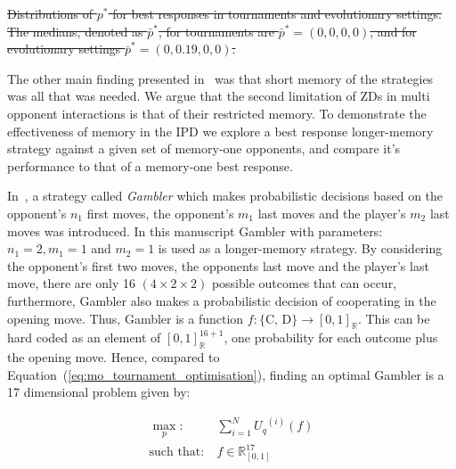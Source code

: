 \documentclass[fleqn,10pt]{wlscirep}
\newcommand{\R}{\mathbb{R}}
\providecommand{\DIFdel}[1]{{\protect\color{red}\sout{#1}}}                      %
\providecommand{\DIFdelbegin}{} %
\providecommand{\DIFdelend}{} %
\providecommand{\DIFdelFL}[1]{\DIFdel{#1}} %
\begin{document}
\DIFdelbegin %
{%
\DIFdelFL{Distributions of \(p^*\) for best responses in tournaments and
    evolutionary settings. The medians, denoted as \(\bar{p}^*\), for tournaments
    are \(\bar{p}^* = (0, 0, 0, 0)\), and for evolutionary settings
    \(\bar{p}^* = (0, 0.19, 0, 0)\). }%
}

\DIFdelend The other main finding presented in~\cite{Press2012} was that
short memory of the strategies was all that was needed.
We argue that the second limitation of ZDs in multi opponent
interactions is that of their restricted memory.
To demonstrate the effectiveness of memory in the IPD we explore a best response
longer-memory strategy against a given set of memory-one opponents,  and compare
it's performance to that of a memory-one best response.

In~\cite{Harper2017}, a strategy called \textit{Gambler} which makes
probabilistic decisions based on the opponent's \(n_1\) first moves, the
opponent's \(m_1\) last moves and the player's \(m_2\) last moves was
introduced. In this manuscript Gambler with parameters: $n_1 = 2, m_1 = 1$ and $m_2 = 1$ is used
as a longer-memory strategy.
By considering the opponent's first two moves, the opponents last move and the
player's last move, there are only 16 $(4 \times 2 \times 2)$ possible outcomes
that can occur, furthermore, Gambler also makes a probabilistic decision of
cooperating in the opening move. Thus, Gambler is a function \(f: \{\text{C,
D}\} \rightarrow [0, 1]_{\R}\). This can be hard coded as an element
of \([0, 1]_{\R} ^ {16 + 1}\), one probability for each outcome plus the opening
move. Hence, compared to Equation~(\ref{eq:mo_tournament_optimisation}), finding an
optimal Gambler is a 17 dimensional problem given by:

\begin{equation}\label{eq:gambler_optimisation}
    \begin{aligned}
    \max_p: & \ \sum_{i=1} ^ {N} {U_q}^{(i)} (f)
    \\
    \text{such that}: & \ f \in \R_{[0, 1]}^{17}
    \end{aligned}
\end{equation}
\end{document}
